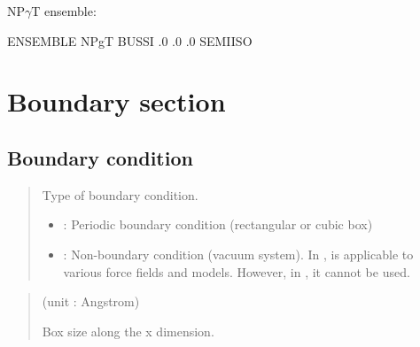 \documentclass[a4paper,11pt,oneside,english]{sphinxmanual}
\begin{document}
NP\(\gamma\)T ensemble:

\begin{sphinxVerbatim}[commandchars=\\\{\}]
\PYG{o}{[}ENSEMBLE\PYG{o}{]}
     NPgT      
    BUSSI     
  .0     
     .0       
        .0     
     SEMI\PYGZhy{}ISO  
\end{sphinxVerbatim}


\chapter{Boundary section}
\label{\detokenize{10_Boundary:boundary-section}}\label{\detokenize{10_Boundary:boundary}}\label{\detokenize{10_Boundary::doc}}

\section{Boundary condition}
\label{\detokenize{10_Boundary:boundary-condition}}
 
\begin{quote}


Type of boundary condition.
\begin{itemize}
\item {} 
: Periodic boundary condition (rectangular or cubic box)

\item {} 
: Non-boundary condition (vacuum system).
In ,  is applicable to various force fields and models.
However, in , it cannot be used.

\end{itemize}
\end{quote}

 
\begin{quote}

 (unit : Angstrom)

Box size along the x dimension.
\end{quote}
\end{document}
